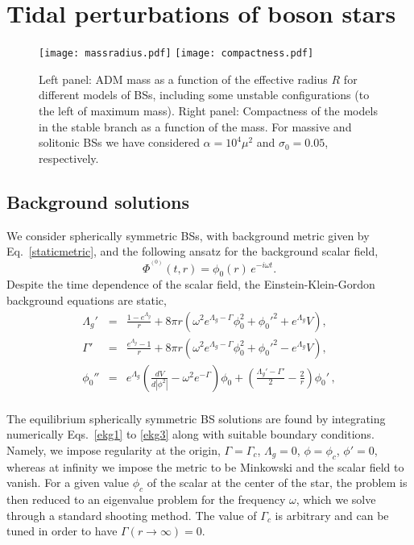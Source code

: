 \documentclass[aps,twocolumn,showpacs,preprintnumbers,nofootinbib,prd,superscriptaddress,groupedaddress,10pt]{revtex4-1}
\def\nn{\nonumber}
\def\be{\begin{equation}}
\def\ee{\end{equation}}
\newcommand{\beq}{\begin{eqnarray}}
\newcommand{\eeq}{\end{eqnarray}}
\begin{document}
\section{Tidal perturbations of boson stars}\label{app:BS}
%
\begin{figure*}[th]
\texttt{[image: massradius.pdf]}\quad
\texttt{[image: compactness.pdf]}
\caption{Left panel: ADM mass as a function of the effective radius $R$ for different models of BSs,
including some unstable configurations (to the left of maximum mass).
Right panel: Compactness of the models in the stable branch as a function of the mass.
For massive and solitonic BSs we have considered $\alpha=10^4\mu^2$ and $\sigma_0=0.05$, respectively.}\label{fig:massradius}
\end{figure*}
%

\subsection{Background solutions}

We consider spherically symmetric BSs, with background metric given by Eq.~\eqref{staticmetric},
and the following ansatz for the background scalar field,
%
\be
\Phi^{^{(0)}}(t,r) = \phi_0(r)\,e^{-i\omega t}.
\ee
%
Despite the time dependence of the scalar field, the Einstein-Klein-Gordon background equations are static,
%
\beq
\Lambda_g' &=& \frac{1-e^{\Lambda_g}}{r} + 8\pi r \left(\omega^2 e^{\Lambda_g-\Gamma}\phi_0^2+\phi_0'^2 + e^{\Lambda_g} V\right),\label{ekg1}\\
%
\Gamma' &=& \frac{e^{\Lambda_g}-1}{r} + 8\pi r \left(\omega^2 e^{\Lambda_g-\Gamma}\phi_0^2+\phi_0'^2 - e^{\Lambda_g} V\right),\label{ekg2}\\
%
\phi_0'' &=& e^{\Lambda_g}\left(\frac{d V}{d|\phi^2|}-\omega^2 e^{-\Gamma}\right)\phi_0 + \left(\frac{\Lambda_g'-\Gamma'}{2}-\frac{2}{r}\right)\phi_0'\,, \nn\\\label{ekg3}
\eeq
%

The equilibrium spherically symmetric BS solutions are found by integrating numerically
Eqs.~\eqref{ekg1} to \eqref{ekg3} along with suitable boundary conditions. Namely, we impose regularity at the
origin, $\Gamma=\Gamma_c$, $\Lambda_g=0$, $\phi=\phi_c$, $\phi'=0$,
whereas at infinity we impose the metric to be Minkowski and the scalar field to vanish.
For a given value $\phi_c$ of the scalar at the center of the star,
the problem is then reduced to an eigenvalue problem for the frequency $\omega$,
which we solve through a standard shooting method. The value of $\Gamma_c$ is arbitrary
and can be tuned in order to have $\Gamma(r\to\infty)=0$.
\end{document}
